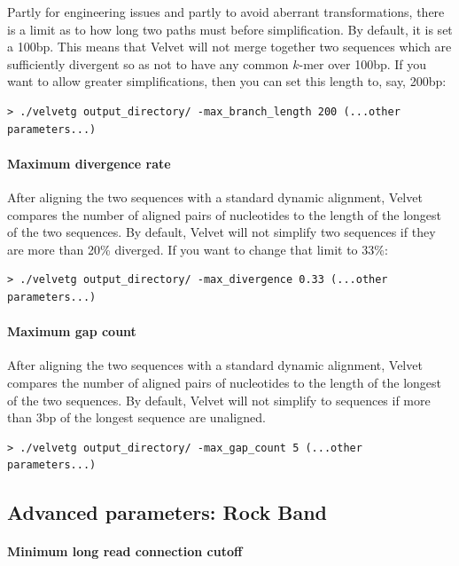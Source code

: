 \documentclass{article}
\begin{document}
Partly for engineering issues and partly to avoid aberrant transformations, there is a limit as to how long two paths must before simplification. By default, it is set a 100bp. This means that Velvet will not merge together two sequences which are sufficiently divergent so as not to have any common $k$-mer over 100bp. If you want to allow greater simplifications, then you can set this length to, say, 200bp:

\begin{verbatim}
> ./velvetg output_directory/ -max_branch_length 200 (...other parameters...)
\end{verbatim} 

\paragraph{Maximum divergence rate}

After aligning the two sequences with a standard dynamic alignment, Velvet compares the number of aligned pairs of nucleotides to the length of the longest of the two sequences. By default, Velvet will not simplify two sequences if they are more than 20\% diverged. If you want to change that limit to 33\%:

\begin{verbatim}
> ./velvetg output_directory/ -max_divergence 0.33 (...other parameters...)
\end{verbatim} 

\paragraph{Maximum gap count}

After aligning the two sequences with a standard dynamic alignment, Velvet compares the number of aligned pairs of nucleotides to the length of the longest of the two sequences. By default, Velvet will not simplify to sequences if more than 3bp of the longest sequence are unaligned.

\begin{verbatim}
> ./velvetg output_directory/ -max_gap_count 5 (...other parameters...)
\end{verbatim} 

\subsection{Advanced parameters: Rock Band}

\paragraph{Minimum long read connection cutoff}
\end{document}
